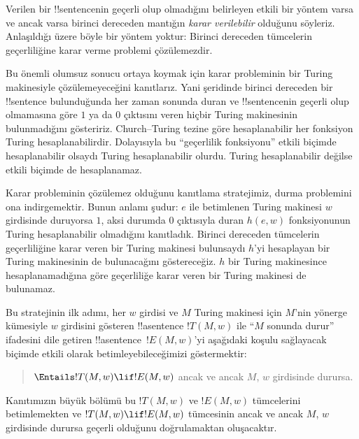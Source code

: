 \documentclass[../../../include/open-logic-section]{subfiles}
\begin{document}

Verilen bir !!{sentence}{}nin geçerli olup olmadığını belirleyen etkili bir
yöntem varsa ve ancak varsa birinci dereceden mantığın \emph{karar
verilebilir} olduğunu söyleriz. Anlaşıldığı üzere böyle bir yöntem yoktur:
Birinci dereceden tümcelerin geçerliliğine karar verme problemi çözülemezdir.

Bu önemli olumsuz sonucu ortaya koymak için karar probleminin bir Turing
makinesiyle çözülemeyeceğini kanıtlarız. Yani şeridinde birinci dereceden bir
!!{sentence} bulunduğunda her zaman sonunda duran ve !!{sentence}{}nin geçerli
olup olmamasına göre $1$ ya da $0$ çıktısını veren hiçbir Turing makinesinin
bulunmadığını gösteririz. Church--Turing tezine göre hesaplanabilir her
fonksiyon Turing hesaplanabilirdir. Dolayısıyla bu ``geçerlilik fonksiyonu''
etkili biçimde hesaplanabilir olsaydı Turing hesaplanabilir olurdu. Turing
hesaplanabilir değilse etkili biçimde de hesaplanamaz.

Karar probleminin çözülemez olduğunu kanıtlama stratejimiz, durma problemini
ona indirgemektir. Bunun anlamı şudur: $e$ ile betimlenen Turing makinesi $w$
girdisinde duruyorsa $1$, aksi durumda $0$ çıktısıyla duran $h(e,w)$
fonksiyonunun Turing hesaplanabilir olmadığını kanıtladık. Birinci dereceden
tümcelerin geçerliliğine karar veren bir Turing makinesi bulunsaydı $h$'yi
hesaplayan bir Turing makinesinin de bulunacağını göstereceğiz. $h$ bir
Turing makinesince hesaplanamadığına göre geçerliliğe karar veren bir Turing
makinesi de bulunamaz.

Bu stratejinin ilk adımı, her $w$ girdisi ve $M$ Turing makinesi için $M$'nin
yönerge kümesiyle $w$ girdisini gösteren !!a{sentence} $!T(M,w)$ ile
``$M$ sonunda durur'' ifadesini dile getiren !!a{sentence}~$!E(M,w)$'yi
aşağıdaki koşulu sağlayacak biçimde etkili olarak betimleyebileceğimizi
göstermektir:
\begin{quote}
  $\Entails !T(M, w) \lif !E(M,w)$ ancak ve ancak $M$, $w$ girdisinde durursa.
\end{quote}
Kanıtımızın büyük bölümü bu $!T(M,w)$ ve $!E(M,w)$ tümcelerini betimlemekten
ve $!T(M,w)\lif !E(M,w)$ tümcesinin ancak ve ancak $M$, $w$ girdisinde
durursa geçerli olduğunu doğrulamaktan oluşacaktır.
\end{document}
